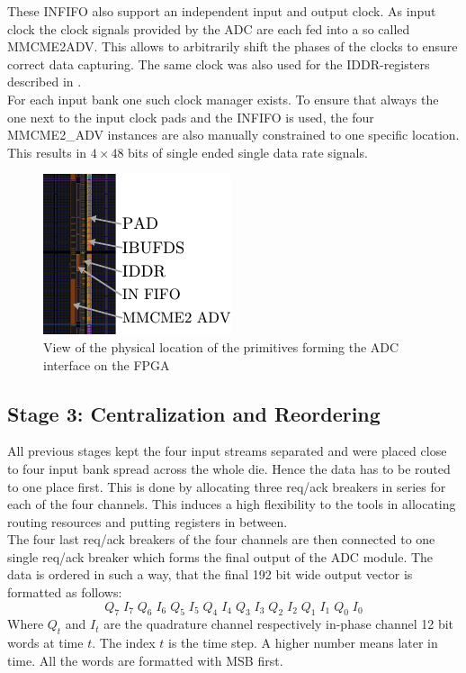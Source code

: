 These \gls{INFIFO} also support an independent input and output clock.
As input clock the clock signals provided by the \gls{ADC} are each fed
into a so called \gls{MMCME2ADV}.
This allows to arbitrarily shift the phases of the clocks to ensure
correct data capturing. The same clock was also used for the
\gls{IDDR}-registers described in . \\

For each input bank one such clock manager exists. To ensure that
always the one next to the input clock pads and the \gls{INFIFO} is
used, the four MMCME2\_ADV instances are also manually constrained to
one specific location. \\

This results in $4 \times 48$ bits of single ended single data rate signals. \\

\begin{figure}
  \centering
  \includegraphics{figures/adc_input_bank}
  \caption{View of the physical location of the primitives forming the
    \gls{ADC} interface on the \gls{FPGA}}
  \label{fig:adc_input_bank}
\end{figure}

\subsection{Stage 3: Centralization and Reordering}
\label{sec:fpga_adc_s3}
All previous stages kept the four input streams separated
and were placed close to four input bank spread across the whole die.
Hence the data has to be routed to one place first.
This is done by allocating three req/ack breakers in series for each of the
four channels.
This induces a high flexibility to the tools in allocating routing
resources and putting registers in between. \\

The four last \gls{req}/\gls{ack} breakers of the four channels are then connected
to one single \gls{req}/\gls{ack} breaker which forms the final output of the
\gls{ADC} module. The data is ordered in such a way, that the final 192 bit
wide output vector is formatted as follows:
\[Q_7\;I_7\;Q_6\;I_6\;Q_5\;I_5\;Q_4\;I_4\;Q_3\;I_3\;Q_2\;I_2\;Q_1\;I_1\;Q_0\;I_0\]
Where $Q_t$ and $I_t$ are the quadrature channel respectively in-phase channel
12 bit words at time $t$.
The index $t$ is the time step. A higher number means later in time.
All the words are formatted with \gls{MSB} first. \\

